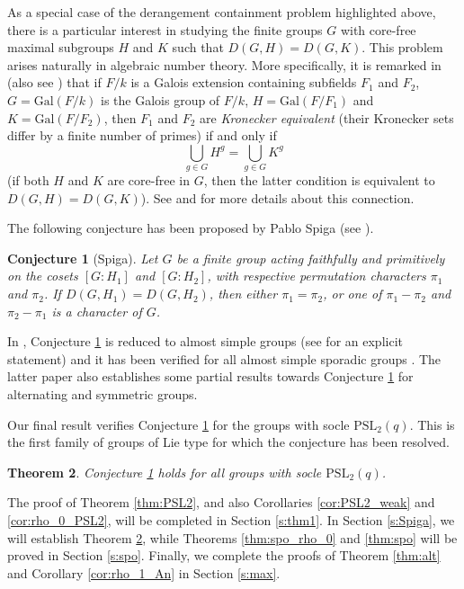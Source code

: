 \documentclass[twoside,a4paper,reqno,11pt]{amsart}
\newcommand{\<}{\langle}
\renewcommand{\>}{\rangle}
\newcommand{\PSL}{\mathrm{PSL}}
\newtheorem{theorem}{Theorem}
\newtheorem{conj}[theorem]{Conjecture}
\theoremstyle{definition}
\begin{document}
	As a special case of the derangement containment problem highlighted above, there is a particular interest in studying the finite groups $G$ with core-free maximal subgroups $H$ and $K$ such that $D(G,H) = D(G,K)$. This problem arises naturally in algebraic number theory. More specifically, it is remarked in \cite[Section 1]{J_number} (also see \cite{K_arith}) that if $F/k$ is a Galois extension containing subfields $F_1$ and $F_2$, $G = \mathrm{Gal}(F/k)$ is the Galois group of $F/k$, $H = \mathrm{Gal}(F/F_1)$ and $K = \mathrm{Gal}(F/F_2)$, then $F_1$ and $F_2$ are \textit{Kronecker equivalent} (their Kronecker sets differ by a finite number of primes) if and only if
	\begin{equation*}
	\bigcup_{g\in G}H^g = \bigcup_{g\in G}K^g
	\end{equation*}
	(if both $H$ and $K$ are core-free in $G$, then the latter condition is equivalent to $D(G,H) = D(G,K)$). See \cite[Section 1.1]{FPS_der} and \cite[Section 4]{P_Kro} for more details about this connection.
	
	The following conjecture has been proposed by Pablo Spiga (see \cite[Conjecture 1]{S_06}).
	
	\begin{conj}[Spiga]
		\label{conj:Spiga}
		Let $G$ be a finite group acting faithfully and primitively on the cosets $[G:H_1]$ and $[G:H_2]$, with respective permutation characters $\pi_1$ and $\pi_2$. If $D(G,H_1) = D(G,H_2)$, then either $\pi_1 = \pi_2$, or one of $\pi_1-\pi_2$ and $\pi_2-\pi_1$ is a character of $G$.
	\end{conj}
	
	In \cite{S_06}, Conjecture \ref{conj:Spiga} is reduced to almost simple groups (see \cite[Theorem 1.2]{S_20} for an explicit statement) and it has been verified for all almost simple sporadic groups \cite[Theorem 1.3]{S_20}. The latter paper also establishes some partial results towards Conjecture \ref{conj:Spiga} for alternating and symmetric groups.
	
	Our final result verifies Conjecture \ref{conj:Spiga} for the groups with socle $\PSL_2(q)$. This is the first family of groups of Lie type for which the conjecture has been resolved.
	
	\begin{theorem}
		\label{thm:Spiga}
		Conjecture \ref{conj:Spiga} holds for all groups with socle $\PSL_2(q)$.
	\end{theorem}
	
	The proof of Theorem \ref{thm:PSL2}, and also Corollaries \ref{cor:PSL2_weak} and \ref{cor:rho_0_PSL2}, will be completed in Section \ref{s:thm1}. In Section \ref{s:Spiga}, we will establish Theorem \ref{thm:Spiga}, while Theorems \ref{thm:spo_rho_0} and \ref{thm:spo} will be proved in Section \ref{s:spo}. Finally, we complete the proofs of Theorem \ref{thm:alt} and Corollary \ref{cor:rho_1_An} in Section \ref{s:max}.
	
\end{document}

